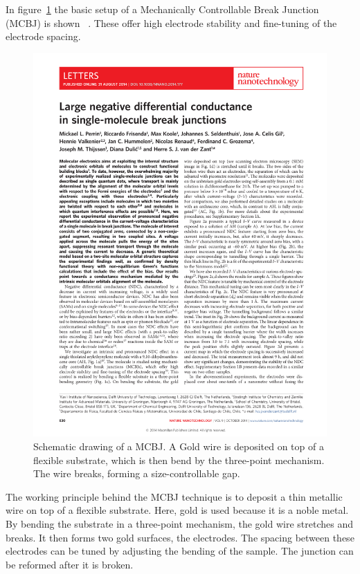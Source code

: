 In figure~\ref{fig:mcbj} the basic setup of a Mechanically Controllable Break Junction (MCBJ) is shown~\citet{perrin} . These offer high electrode stability and fine-tuning of the electrode spacing. 
\begin{figure}[!bp]
    \centering
    \includegraphics[height=0.3\textheight,page=2, clip=true, trim=2.5cm 16.5cm 11cm 6cm]{pdf/perrinnnano.pdf}
    \caption{Schematic drawing of a MCBJ. A Gold wire is deposited on top of a flexible substrate, which is then bend by the three-point mechanism. The wire breaks, forming a size-controllable gap.}
    \label{fig:mcbj}
\end{figure}

The working principle behind the MCBJ technique is to deposit a thin metallic wire on top of a flexible substrate. Here, gold is used because it is a noble metal. By bending the substrate in a three-point mechanism, the gold wire stretches and breaks. It then forms two gold surfaces, the electrodes. The spacing between these electrodes can be tuned by adjusting the bending of the sample. The junction can be reformed after it is broken.


